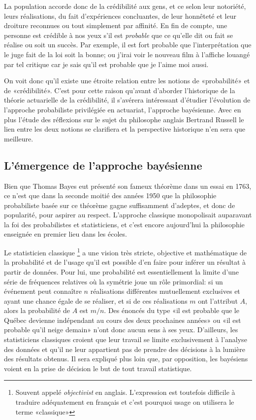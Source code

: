 La population accorde donc de la crédibilité aux gens, et ce selon
leur notoriété, leurs réalisations, du fait d'expériences concluantes,
de leur honnêteté et leur droiture reconnues ou tout simplement par
affinité. En fin de compte, une personne est crédible à nos yeux s'il
est \emph{probable} que ce qu'elle dit ou fait se réalise ou soit un
succès. Par exemple, il est fort probable que l'interprétation que le
juge fait de la loi soit la bonne; ou j'irai voir le nouveau film à
l'affiche louangé par tel critique car je sais qu'il est probable que
je l'aime moi aussi.

On voit donc qu'il existe une étroite relation entre les notions de
«probabilité» et de «crédibilité». C'est pour cette raison qu'avant
d'aborder l'historique de la théorie actuarielle de la crédibilité, il
s'avérera intéressant d'étudier l'évolution de l'approche probabiliste
privilégiée en actuariat, l'approche bayésienne. Avec en plus l'étude
des réflexions sur le sujet du philosophe anglais Bertrand Russell le
lien entre les deux notions se clarifiera et la perspective historique
n'en sera que meilleure.

\subsection{L'émergence de l'approche bayésienne}
\label{sec:introduction-historique:historique:emergence}

Bien que Thomas Bayes eut présenté son fameux théorème dans un essai
en 1763, ce n'est que dans la seconde moitié des années 1950 que la
philosophie probabiliste basée sur ce théorème gagne suffisamment
d'adeptes, et donc de popularité, pour aspirer au respect. L'approche
classique monopolisait auparavant la foi des probabilistes et
statisticiens, et c'est encore aujourd'hui la philosophie enseignée en
premier lieu dans les écoles.

Le statisticien classique%
\footnote{Souvent appelé \emph{objectivist} en anglais. L'expression
  est toutefois difficile à traduire adéquatement en français et c'est
  pourquoi usage on utilisera le terme «classique»} %
a une vision très stricte, objective et mathématique de la probabilité
et de l'usage qu'il est possible d'en faire pour inférer un résultat à
partir de données. Pour lui, une probabilité est essentiellement la
limite d'une série de fréquences relatives où la symétrie joue un rôle
primordial: si un événement peut connaître $n$ réalisations
différentes mutuellement exclusives et ayant une chance égale de se
réaliser, et si de ces réalisations $m$ ont l'attribut $A$, alors la
probabilité de $A$ est $m/n$. Des énoncés du type «il est probable que
le Québec devienne indépendant au cours des deux prochaines années» ou
«il est probable qu'il neige demain» n'ont donc aucun sens à ses yeux.
D'ailleurs, les statisticiens classiques croient que leur travail se
limite exclusivement à l'analyse des données et qu'il ne leur
appartient pas de prendre des décisions à la lumière des résultats
obtenus. Il sera expliqué plus loin que, par opposition, les bayésiens
voient en la prise de décision le but de tout travail statistique.

